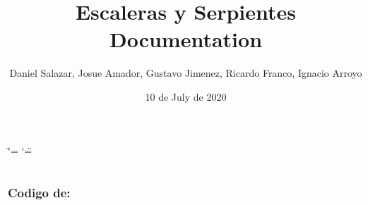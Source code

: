 \documentclass[letterpaper,10pt,english]{sphinxmanual}
\title{Escaleras y Serpientes Documentation}
\date{10 de July de 2020}
\author{Daniel Salazar, Josue Amador, Gustavo Jimenez, Ricardo Franco, Ignacio Arroyo}
\begin{document}
\ifdefined\shorthandoff
  \ifnum\catcode`\=\string=\active\shorthandoff{=}\fi
  \ifnum\catcode`\"=\active{}\fi
\fi

\pagestyle{empty}
\sphinxmaketitle
\pagestyle{plain}
\sphinxtableofcontents
\pagestyle{normal}
\label{\detokenize{Escaleras_y_Serpientes::doc}}



\chapter{}
\label{\detokenize{Escaleras_y_Serpientes:informacion-importante}}

\section{}
\label{\detokenize{codigo:codigo-generado-automaticamente}}\label{\detokenize{codigo::doc}}

\subsection{Codigo de: }
\label{\detokenize{codigo:module-jugador}}\label{\detokenize{codigo:codigo-de-jugador}}
\end{document}
